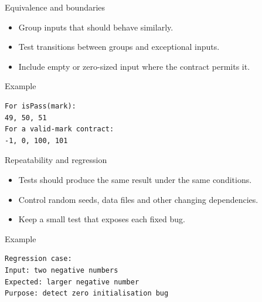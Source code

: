 \documentclass[10pt,aspectratio=169]{beamer}
\begin{document}
\begin{frame}[fragile,t]{Equivalence and boundaries}
\begin{itemize}
\item Group inputs that should behave similarly.
\item Test transitions between groups and exceptional inputs.
\item Include empty or zero-sized input where the contract permits it.
\end{itemize}
\vspace{1mm}\begin{block}{Example}
\begin{lstlisting}
For isPass(mark):
49, 50, 51
For a valid-mark contract:
-1, 0, 100, 101
\end{lstlisting}
\end{block}
\end{frame}

\begin{frame}[fragile,t]{Repeatability and regression}
\begin{itemize}
\item Tests should produce the same result under the same conditions.
\item Control random seeds, data files and other changing dependencies.
\item Keep a small test that exposes each fixed bug.
\end{itemize}
\vspace{1mm}\begin{block}{Example}
\begin{lstlisting}
Regression case:
Input: two negative numbers
Expected: larger negative number
Purpose: detect zero initialisation bug
\end{lstlisting}
\end{block}
\end{frame}
\end{document}
